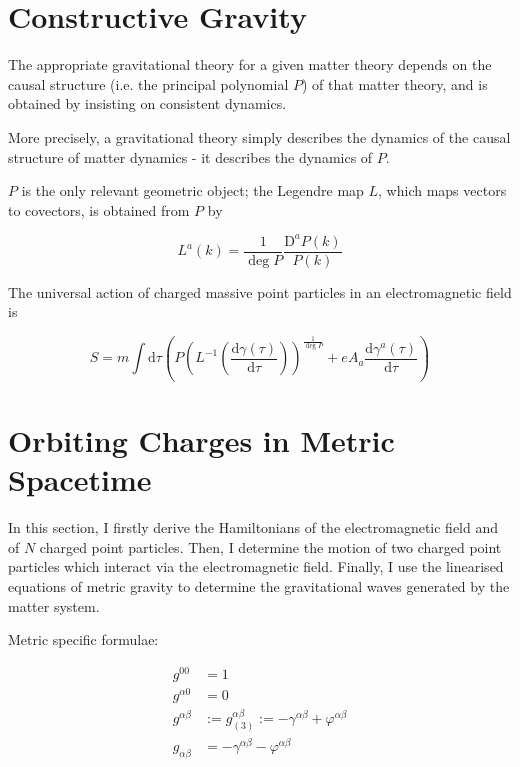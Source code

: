 \documentclass[11pt]{article}
\begin{document}
\section{Constructive Gravity}

The appropriate gravitational theory for a given matter theory depends on the causal structure (i.e. the principal polynomial $P$) of that matter theory, and is obtained by insisting on consistent dynamics. 

More precisely, a gravitational theory simply describes the dynamics of the causal structure of matter dynamics - it describes the dynamics of $P$.

$P$ is the only relevant geometric object; the Legendre map $L$, which maps vectors to covectors, is obtained from $P$ by

\begin{equation}
	L^a \left( k \right) = \frac{1}{\deg{P}}\frac{\mathrm{D}^a P \left( k \right)}{P\left(k\right)}
\end{equation}

The universal action of charged massive point particles in an electromagnetic field is

\begin{equation} \label{act_pp_univ}
	S = m \int \mathrm{d}\tau 
	\left(
		P 
		\left(
			L^{-1} 
			\left( 
				\frac{\mathrm{d} \gamma\left(\tau \right)}{\mathrm{d}\tau} 
			\right) 
		\right)^{\frac{1}{\deg{P}}}
		+ e A_a \frac{\mathrm{d} \gamma^a\left(\tau \right)}{\mathrm{d}\tau} 
	\right)
\end{equation}

\section{Orbiting Charges in Metric Spacetime}

In this section, I firstly derive the Hamiltonians of the electromagnetic field and of $N$ charged point particles. Then, I determine the motion of two charged point particles which interact via the electromagnetic field. Finally, I use the linearised equations of metric gravity to determine the gravitational waves generated by the matter system. 

Metric specific formulae:

\begin{align}
	g^{00} &= 1 \\
	g^{\alpha 0} &= 0 \\
	g^{\alpha \beta} &:= g_{(3)}^{\alpha \beta}  := - \gamma^{\alpha \beta} + \varphi^{\alpha \beta}\\
	g_{\alpha \beta} &= - \gamma^{\alpha \beta} - \varphi^{\alpha \beta}
\end{align}
\end{document}
